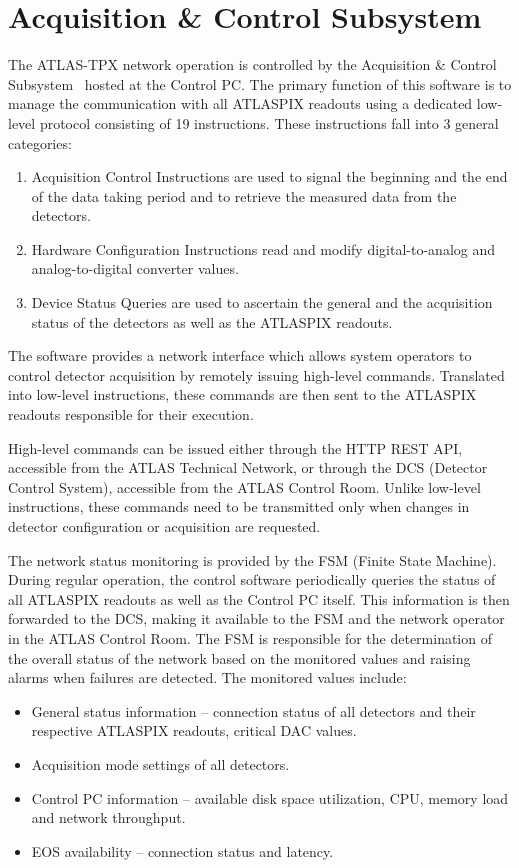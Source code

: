 

\section{\label{sec:acquisition}Acquisition \& Control Subsystem}
The ATLAS-TPX network operation is controlled by the Acquisition \& Control Subsystem~\cite{Begera2016} hosted at the Control PC. The primary function of this software is to manage the communication with all ATLASPIX readouts using a dedicated low-level protocol consisting of 19 instructions. These instructions fall into 3 general categories:
~
\begin{enumerate}
  \item Acquisition Control Instructions are used to signal the beginning and the end of the data taking period and to retrieve the measured data from the detectors.
  \item Hardware Configuration Instructions read and modify digital-to-analog and analog-to-digital converter values.
  \item Device Status Queries are used to ascertain the general and the acquisition status of the detectors as well as the ATLASPIX readouts.
\end{enumerate}

The software provides a network interface which allows system operators to control detector acquisition by remotely issuing high-level commands. Translated into low-level instructions, these commands are then sent to the ATLASPIX readouts responsible for their execution.

High-level commands can be issued either through the HTTP REST API, accessible from the ATLAS Technical Network, or through the DCS (Detector Control System), accessible from the ATLAS Control Room. Unlike low-level instructions, these commands need to be transmitted only when changes in detector configuration or acquisition are requested.

The network status monitoring is provided by the FSM (Finite State Machine). During regular operation, the control software periodically queries the status of all ATLASPIX readouts as well as the Control PC itself. This information is then forwarded to the DCS, making it available to the FSM and the network operator in the ATLAS Control Room. The FSM is responsible for the determination of the overall status of the network based on the monitored values and raising alarms when failures are detected. The monitored values include:
~
\begin{itemize}
  \item General status information -- connection status of all detectors and their respective ATLASPIX readouts, critical DAC values.
  \item Acquisition mode settings of all detectors.
  \item Control PC information -- available disk space utilization, CPU, memory load and network throughput.
  \item EOS availability -- connection status and latency.
\end{itemize}

